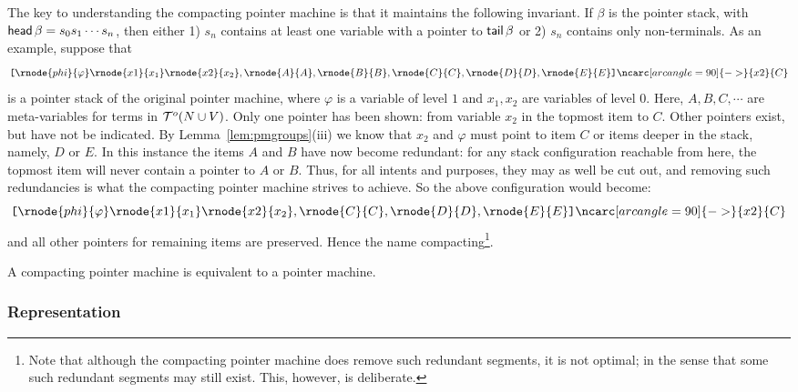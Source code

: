 The key to understanding the compacting pointer machine is that it
maintains the following invariant. If $\beta$ is the pointer
stack, with ${\sf head}\,{\beta} = s_0 s_1 \cdots s_n$, then either 1)
$s_n$ contains at least one variable with a pointer to ${\sf tail}\,{\beta}$ or 2) $s_n$ contains only non-terminals. As an example,
suppose that
\begin{equation}
\nonumber \stackl {\rnode{phi}{\varphi}} {\rnode{x1}{x_1}}
{\rnode{x2}{x_2}}, {\rnode{A}{A}}, {}\rnode{B}{B}, {\rnode{C}{C}},
{\rnode{D}{D}}, {\rnode{E}{E}}\stackr \ncarc[arcangle=90]{->}{x2}{C}
\end{equation}
is a pointer stack of the original pointer machine, where
$\varphi$ is a variable of level $1$ and $x_1,x_2$ are variables
of level $0$. Here, $A, B, C, \cdots$  are meta-variables for terms in
${\cal T}^o(N \cup V)$. Only one pointer has been shown: from variable $x_2$
in the topmost item to $C$. Other pointers exist, but have not be
indicated. By Lemma~\ref{lem:pmgroups}(iii) we know that $x_2$ and
$\varphi$ must point to item $C$ or items deeper in the stack,
namely, $D$ or $E$. In this instance the items $A$ and $B$ have
now become redundant: for any stack configuration reachable from
here, the topmost item will never contain a pointer to $A$ or $B$.
Thus, for all intents and purposes, they may as well be cut out,
and removing such redundancies is what the compacting pointer
machine strives to achieve. So the above configuration would
become:
\begin{equation}
\nonumber \stackl {\rnode{phi}{\varphi}} {\rnode{x1}{x_1}}
{\rnode{x2}{x_2}}, {\rnode{C}{C}}, {\rnode{D}{D}}, {\rnode{E}{E}}\stackr
\ncarc[arcangle=90]{->}{x2}{C}
\end{equation}
and all other pointers for remaining items are preserved. Hence
the name compacting\footnote{Note that although the compacting
pointer machine does remove such redundant segments, it is not
optimal; in the sense that some such redundant segments may still
exist. This, however, is deliberate.}.

\begin{lemma} A compacting pointer machine is equivalent to a
pointer machine. \myendproof
\end{lemma}


\subsubsection*{Representation}

